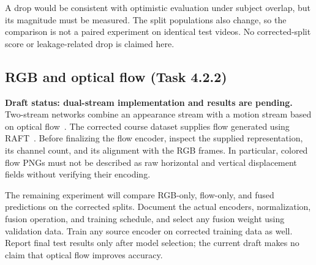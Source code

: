 A drop would be consistent with optimistic evaluation under subject
overlap, but its magnitude must be measured. The split populations also
change, so the comparison is not a paired experiment on identical test
videos. No corrected-split score or leakage-related drop is claimed here.

\subsection{RGB and optical flow (Task 4.2.2)}
\label{sec:dualstream}
\textbf{Draft status: dual-stream implementation and results are pending.}
Two-stream networks combine an appearance stream with a motion stream
based on optical flow~\cite{simonyan2014twostream}. The corrected course
dataset supplies flow generated using RAFT~\cite{course2026,teed2020raft}.
Before finalizing the flow encoder, inspect the supplied representation,
its channel count, and its alignment with the RGB frames. In particular,
colored flow PNGs must not be described as raw horizontal and vertical
displacement fields without verifying their encoding.

The remaining experiment will compare RGB-only, flow-only, and fused
predictions on the corrected splits. Document the actual encoders,
normalization, fusion operation, and training schedule, and select any
fusion weight using validation data. Train any source encoder on corrected
training data as well. Report final test results only after model selection;
the current draft makes no claim that optical flow improves accuracy.
